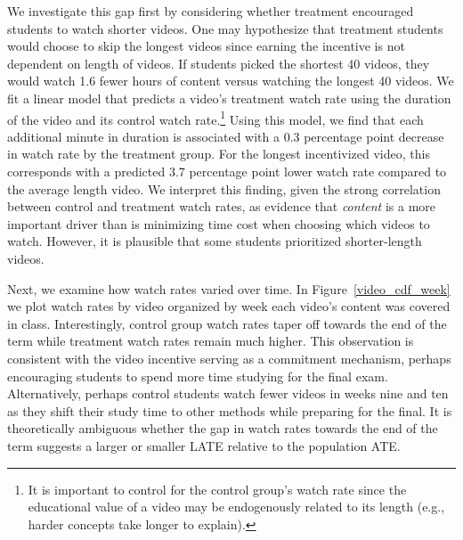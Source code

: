 \documentclass[12pt]{article}
\begin{document}
We investigate this gap first by considering whether treatment encouraged students to watch shorter videos.
One may hypothesize that treatment students would choose to skip the longest videos since earning the incentive is not dependent on length of videos.
If students picked the shortest 40 videos, they would watch 1.6 fewer hours of content versus watching the longest 40 videos.
We fit a linear model that predicts a video's treatment watch rate using the duration of the video and its control watch rate.\footnote{It is important to control for the control group's watch rate since the educational value of a video may be endogenously related to its length (e.g., harder concepts take longer to explain).} Using this model, we find that each additional minute in duration is associated with a 0.3 percentage point decrease in watch rate by the treatment group.
For the longest incentivized video, this corresponds with a predicted 3.7 percentage point lower watch rate compared to the average length video.
We interpret this finding, given the strong correlation between control and treatment watch rates, as evidence that \textit{content} is a more important driver than is minimizing time cost when choosing which videos to watch.
However, it is plausible that some students prioritized shorter-length videos.

Next, we examine how watch rates varied over time.
In Figure~\ref{video_cdf_week} we plot watch rates by video organized by week each video's content was covered in class.
Interestingly, control group watch rates taper off towards the end of the term while treatment watch rates remain much higher.
This observation is consistent with the video incentive serving as a commitment mechanism, perhaps encouraging students to spend more time studying for the final exam.
Alternatively, perhaps control students watch fewer videos in weeks nine and ten as they shift their study time to other methods while preparing for the final.
It is theoretically ambiguous whether the gap in watch rates towards the end of the term suggests a larger or smaller LATE relative to the population ATE.
\end{document}
